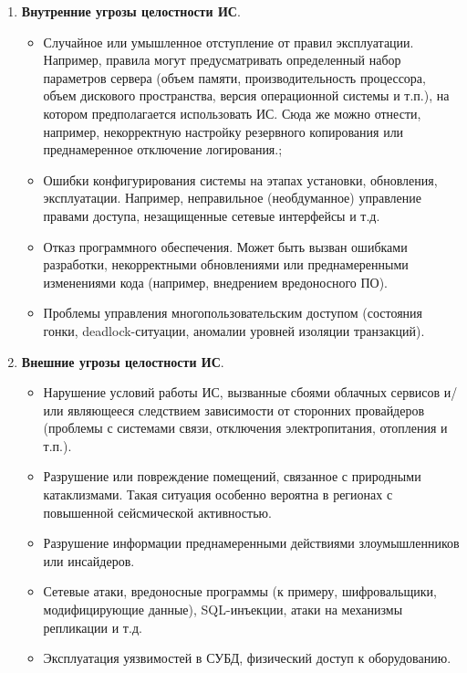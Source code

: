 \begin{enumerate}
\item \textbf{Внутренние угрозы целостности ИС}.
    \begin{itemize}
        \item Случайное или умышленное отступление от правил эксплуатации. Например, правила могут предусматривать определенный набор параметров сервера (объем памяти, производительность процессора, объем дискового пространства, версия операционной системы и т.п.), на котором предполагается использовать ИС. Сюда же можно отнести, например, некорректную настройку резервного копирования или преднамеренное отключение логирования.;
        \item Ошибки конфигурирования системы на этапах установки, обновления, эксплуатации. Например, неправильное (необдуманное) управление правами доступа, незащищенные сетевые интерфейсы и т.д.
        \item Отказ программного обеспечения. Может быть вызван ошибками разработки, некорректными обновлениями или преднамеренными изменениями кода (например, внедрением вредоносного ПО).
	    \item Проблемы управления многопользовательским доступом (состояния гонки, deadlock-ситуации, аномалии уровней изоляции транзакций).
    \end{itemize}

\item \textbf{Внешние угрозы целостности ИС}.
    \begin{itemize}
        \item Нарушение условий работы ИС, вызванные сбоями облачных сервисов и/или являющееся следствием зависимости от сторонних провайдеров (проблемы с системами связи, отключения электропитания, отопления и т.п.).
        \item Разрушение или повреждение помещений, связанное с природными катаклизмами. Такая ситуация особенно вероятна в регионах с повышенной сейсмической активностью.
        \item Разрушение информации преднамеренными действиями злоумышленников или инсайдеров.
        \item Сетевые атаки, вредоносные программы (к примеру, шифровальщики, модифицирующие данные), SQL-инъекции, атаки на механизмы репликации и т.д.
	\item Эксплуатация уязвимостей в СУБД, физический доступ к оборудованию.
    \end{itemize}
\end{enumerate}

